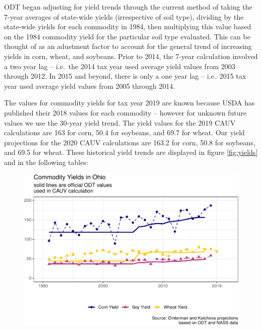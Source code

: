 \documentclass[]{article}
\begin{document}
ODT began adjusting for yield trends through the current method of
taking the 7-year averages of state-wide yields (irrespective of soil
type), dividing by the state-wide yields for each commodity in 1984,
then multiplying this value based on the 1984 commodity yield for the
particular soil type evaluated. This can be thought of as an adustment
factor to account for the general trend of increasing yields in corn,
wheat, and soybeans. Prior to 2014, the 7-year calculation involved a
two year lag -- i.e.~the 2014 tax year used average yield values from
2003 through 2012. In 2015 and beyond, there is only a one year lag --
i.e.~2015 tax year used average yield values from 2005 through 2014.

The values for commodity yields for tax year 2019 are known because USDA
has published their 2018 values for each commodity -- however for
unknown future values we use the 30-year yield trend. The yield values
for the 2019 CAUV calculations are 163 for corn, 50.4 for soybeans, and
69.7 for wheat. Our yield projections for the 2020 CAUV calculations are
163.2 for corn, 50.8 for soybeans, and 69.5 for wheat. These historical
yield trends are displayed in figure \ref{fig:yields} and in the
following tables:

\begin{figure}[H]
\includegraphics[width=1\linewidth]{4-projections-2019-2020_files/figure-latex/viz-yields-1} \caption{\label{fig:yields}}\label{fig:viz-yields}
\end{figure}

\newpage
\end{document}

